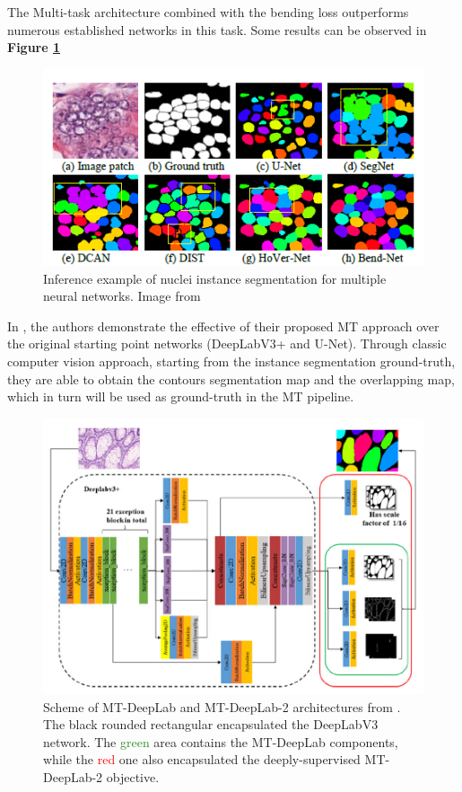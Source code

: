 The Multi-task architecture combined with the bending loss outperforms numerous established networks in this task. Some results can be observed in \textbf{Figure \ref{bend_results}}

\begin{figure}[htb]
    \centering
	\centerline{\includegraphics[scale=1]{figures/bend_results.png}}
	\caption{Inference example of nuclei instance segmentation for multiple neural networks. Image from \cite{wang2021bend}}
	\label{bend_results}
\end{figure}

In \cite{rezazadeh2023multi}, the authors demonstrate the effective of their proposed MT approach over the original starting point networks (DeepLabV3+ \cite{chen2018encoder} and U-Net). Through classic computer vision approach, starting from the instance segmentation ground-truth, they are able to obtain the contours segmentation map and the overlapping map, which in turn will be used as ground-truth in the MT pipeline. 

\begin{figure}[htb]
    \centering
	\centerline{\includegraphics[scale=0.9]{figures/mt_deeplab.png}}
	\caption{Scheme of MT-DeepLab and MT-DeepLab-2 architectures from \cite{rezazadeh2023multi}. The black rounded rectangular encapsulated the DeepLabV3 network. The \textcolor{forestgreen}{green} area contains the MT-DeepLab components, while the \textcolor{red}{red} one also encapsulated the deeply-supervised MT-DeepLab-2 objective.}
	\label{mt_deeplab}
\end{figure}


